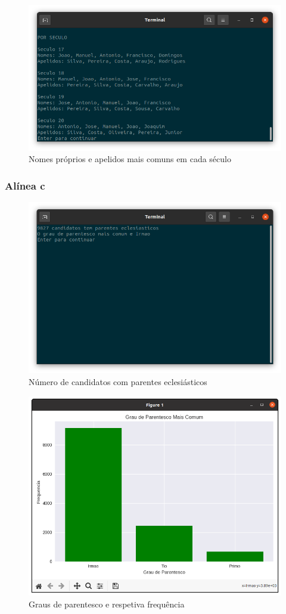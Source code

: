 \documentclass[a4paper, 11pt]{article}
\begin{document}
\begin{figure}[H]
    \centering
    \includegraphics[width=.8\textwidth]{img/b.png}
    \caption{Nomes próprios e apelidos mais comuns em cada século}
\end{figure}

\subsubsection{Alínea c}

\begin{figure}[H]
    \centering
    \includegraphics[width=.8\textwidth]{img/c1.png}
    \caption{Número de candidatos com parentes eclesiásticos}
\end{figure}

\begin{figure}[H]
    \centering
    \includegraphics[width=.8\textwidth]{img/c2.png}
    \caption{Graus de parentesco e respetiva frequência}
\end{figure}
\end{document}
